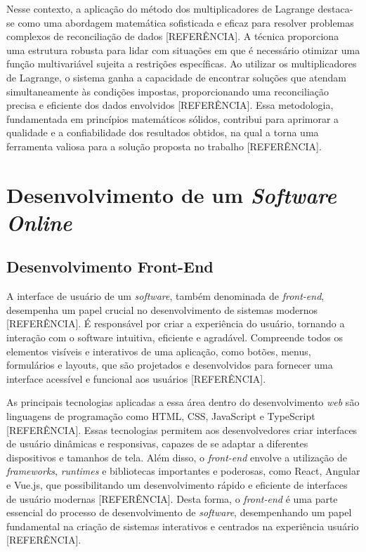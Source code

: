 Nesse contexto, a aplicação do método dos multiplicadores de Lagrange destaca-se como uma abordagem matemática sofisticada e eficaz para resolver problemas complexos de reconciliação de dados [REFERÊNCIA]. A técnica proporciona uma estrutura robusta para lidar com situações em que é necessário otimizar uma função multivariável sujeita a restrições específicas. Ao utilizar os multiplicadores de Lagrange, o sistema ganha a capacidade de encontrar soluções que atendam simultaneamente às condições impostas, proporcionando uma reconciliação precisa e eficiente dos dados envolvidos [REFERÊNCIA]. Essa metodologia, fundamentada em princípios matemáticos sólidos, contribui para aprimorar a qualidade e a confiabilidade dos resultados obtidos, na qual a torna uma ferramenta valiosa para a solução proposta no trabalho [REFERÊNCIA].

\section{Desenvolvimento de um \textit{Software Online}}

\subsection{Desenvolvimento Front-End}

A interface de usuário de um \textit{software}, também denominada de \textit{front-end}, desempenha um papel crucial no desenvolvimento de sistemas modernos [REFERÊNCIA]. É responsável por criar a experiência do usuário, tornando a interação com o software intuitiva, eficiente e agradável. Compreende todos os elementos visíveis e interativos de uma aplicação, como botões, menus, formulários e layouts, que são projetados e desenvolvidos para fornecer uma interface acessível e funcional aos usuários [REFERÊNCIA].

As principais tecnologias aplicadas a essa área dentro do desenvolvimento \textit{web} são linguagens de programação como HTML, CSS, JavaScript e TypeScript [REFERÊNCIA]. Essas tecnologias permitem aos desenvolvedores criar interfaces de usuário dinâmicas e responsivas, capazes de se adaptar a diferentes dispositivos e tamanhos de tela. Além disso, o \textit{front-end} envolve a utilização de \textit{frameworks}, \textit{runtimes} e bibliotecas importantes e poderosas, como React, Angular e Vue.js, que possibilitando um desenvolvimento rápido e eficiente de interfaces de usuário modernas [REFERÊNCIA]. Desta forma, o \textit{front-end} é uma parte essencial do processo de desenvolvimento de \textit{software}, desempenhando um papel fundamental na criação de sistemas interativos e centrados na experiência usuário [REFERÊNCIA].

